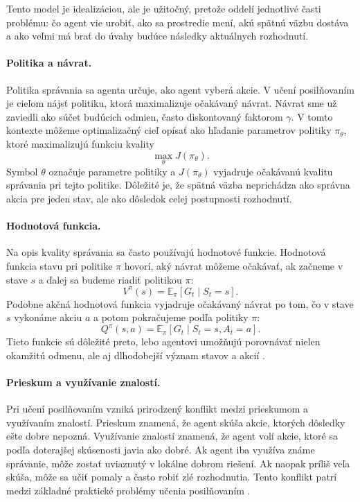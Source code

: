 Tento model je idealizáciou, ale je užitočný, pretože oddelí jednotlivé časti problému: čo agent vie urobiť, ako sa prostredie mení, akú spätnú väzbu dostáva a ako veľmi má brať do úvahy budúce následky aktuálnych rozhodnutí.

\paragraph{Politika a návrat.}
Politika správania sa agenta určuje, ako agent vyberá akcie. V učení posilňovaním je cieľom nájsť politiku, ktorá maximalizuje očakávaný návrat. Návrat sme už zaviedli ako súčet budúcich odmien, často diskontovaný faktorom $\gamma$. V tomto kontexte môžeme optimalizačný cieľ opísať ako hľadanie parametrov politiky $\pi_\theta$, ktoré maximalizujú funkciu kvality
\[
    \max_\theta J(\pi_\theta).
\]
Symbol $\theta$ označuje parametre politiky a $J(\pi_\theta)$ vyjadruje očakávanú kvalitu správania pri tejto politike. Dôležité je, že spätná väzba neprichádza ako správna akcia pre jeden stav, ale ako dôsledok celej postupnosti rozhodnutí.

\paragraph{Hodnotová funkcia.}
Na opis kvality správania sa často používajú hodnotové funkcie. Hodnotová funkcia stavu pri politike $\pi$ hovorí, aký návrat môžeme očakávať, ak začneme v stave $s$ a ďalej sa budeme riadiť politikou $\pi$:
\[
    V^\pi(s) = \mathbb{E}_\pi[G_t \mid S_t = s].
\]
Podobne akčná hodnotová funkcia vyjadruje očakávaný návrat po tom, čo v stave $s$ vykonáme akciu $a$ a potom pokračujeme podľa politiky $\pi$:
\[
    Q^\pi(s,a) = \mathbb{E}_\pi[G_t \mid S_t = s, A_t = a].
\]
Tieto funkcie sú dôležité preto, lebo agentovi umožňujú porovnávať nielen okamžitú odmenu, ale aj dlhodobejší význam stavov a akcií \cite{sutton_barto2018rl}.

\paragraph{Prieskum a využívanie znalostí.}
Pri učení posilňovaním vzniká prirodzený konflikt medzi prieskumom a využívaním znalostí. Prieskum znamená, že agent skúša akcie, ktorých dôsledky ešte dobre nepozná. Využívanie znalostí znamená, že agent volí akcie, ktoré sa podľa doterajšej skúsenosti javia ako dobré. Ak agent iba využíva známe správanie, môže zostať uviaznutý v lokálne dobrom riešení. Ak naopak príliš veľa skúša, môže sa učiť pomaly a často robiť zlé rozhodnutia. Tento konflikt patrí medzi základné praktické problémy učenia posilňovaním \cite{sutton_barto2018rl}.

